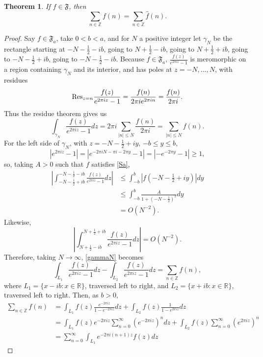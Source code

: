 \documentclass{article}
\newcommand{\Res}{\ensuremath\mathrm{Res}}
\newtheorem{theorem}{Theorem}
\theoremstyle{definition}
\begin{document}
\begin{theorem}
If $f \in \mathfrak{F}$, then
\[
\sum_{n \in \mathbb{Z}} f(n) = \sum_{n \in \mathbb{Z}} \widehat{f}(n).
\]
\end{theorem}
\begin{proof}
Say $f \in \mathfrak{F}_a$, take $0<b<a$, and for $N$ a positive integer
 let $\gamma_N$ be the rectangle starting at $-N-\frac{1}{2}-ib$, going to $N+\frac{1}{2}-ib$, going to
 $N+\frac{1}{2}+ib$, going to $-N-\frac{1}{2}+ib$, going to $-N-\frac{1}{2}-ib$. Because $f \in \mathfrak{F}_a$,
$\frac{f(z)}{e^{2\pi iz}-1}$ is meromorphic on a region containing $\gamma_N$ and its interior, and has poles
at $z=-N,\ldots,N$, with residues
\[
\Res_{z=n} \frac{f(z)}{e^{2\pi iz}-1}
=\frac{f(n)}{2\pi i e^{2\pi in}}
=\frac{f(n)}{2\pi i}.
\]
Thus the residue theorem gives us
\begin{equation}
\int_{\gamma_N} \frac{f(z)}{e^{2\pi iz}-1} dz = 2\pi i \sum_{|n| \leq N} \frac{f(n)}{2\pi i}
=\sum_{|n| \leq N} f(n).
\label{gammaN}
\end{equation}
For the left side of $\gamma_N$, with $z=-N-\frac{1}{2}+iy$, $-b \leq y \leq b$,
\[
|e^{2\pi iz}-1| = |e^{-2\pi iN - \pi i -2\pi y} - 1|
=|-e^{-2\pi y}-1| \geq 1,
\]
so, taking $A>0$ such that $f$ satisfies \eqref{Sa},
\begin{align*}
\left| \int_{-N-\frac{1}{2}+ib}^{-N-\frac{1}{2}-ib} \frac{f(z)}{e^{2\pi iz}-1} dz\right|&
\leq \int_{-b}^b \left| f\left(-N-\frac{1}{2}+iy\right) \right|dy\\
&\leq \int_{-b}^b \frac{A}{1+\left(-N-\frac{1}{2}\right)^2} dy\\
&=O(N^{-2}).
\end{align*}
Likewise,
\[
\left| \int_{N+\frac{1}{2}-ib}^{N+\frac{1}{2}+ib} \frac{f(z)}{e^{2\pi iz}-1} dz\right| = O(N^{-2}).
\]
Therefore, taking $N \to \infty$, \eqref{gammaN} becomes
\[
\int_{L_1}  \frac{f(z)}{e^{2\pi iz}-1} dz
- \int_{L_2}  \frac{f(z)}{e^{2\pi iz}-1} dz = \sum_{n \in \mathbb{Z}} f(n),
\]
where $L_1=\{x-ib: x \in \mathbb{R}\}$, traversed left to right, and $L_2=\{x+ib:x \in \mathbb{R}\}$, traversed left to right.
Then, as $b>0$,
\begin{align*}
\sum_{n \in \mathbb{Z}} f(n)&=\int_{L_1}  f(z) \frac{e^{-2\pi iz}}{1-e^{-2\pi iz}} dz
+ \int_{L_2} f(z) \frac{1}{1-e^{2\pi iz}} dz\\
&=\int_{L_1} f(z) e^{-2\pi iz} \sum_{n =0}^\infty (e^{-2\pi iz})^n dz
+\int_{L_2} f(z) \sum_{n=0}^\infty (e^{2\pi iz})^n\\
&=\sum_{n=0}^\infty \int_{L_1} e^{-2\pi i(n+1)z} f(z) dz

\end{align*}
\end{proof}
\end{document}

